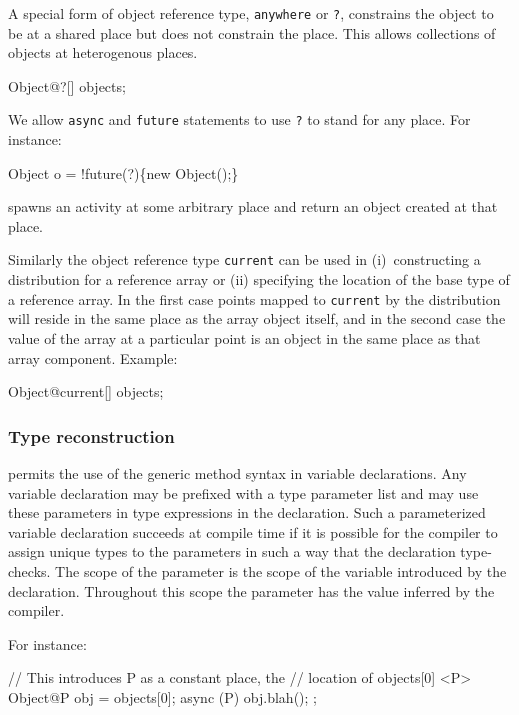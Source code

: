 A special form of object reference type, {\tt anywhere} or {\tt ?}, 
constrains the object to be at a shared place but does not constrain
the place. This allows collections of objects at heterogenous places.

\begin{x10}
    Object@?[] objects;
\end{x10}

We allow {\tt async} and {\tt future} statements to use {\tt ?} to
stand for any place. For instance:

\begin{x10}
     Object o = !future(?)\{new Object();\}
\end{x10}

\noindent spawns an activity at some arbitrary place and return an object created at that place.

Similarly the object reference type {\tt current} can be used in
(i)~constructing a distribution for a reference array or (ii)
specifying the location of the base type of a reference array. In the
first case points mapped to {\tt current} by the distribution will
reside in the same place as the array object itself, and in the second
case the value of the array at a particular point is an object in the
same place as that array component. Example:
\begin{x10}
    Object@current[] objects;
\end{x10}

\subsubsection{Type reconstruction}

{}\Xten{} permits the use of the generic method syntax in variable
declarations. Any variable declaration may be prefixed with a type
parameter list and may use these parameters in type expressions in the
declaration. Such a parameterized variable declaration succeeds at
compile time if it is possible for the compiler to assign unique types
to the parameters in such a way that the declaration type-checks.  The
scope of the parameter is the scope of the variable introduced by the
declaration. Throughout this scope the parameter has the value
inferred by the compiler.

For instance:
\begin{x10}
  // This introduces P as a constant place, the
  // location of objects[0]
 <P> Object@P obj = objects[0];
 async (P) { obj.blah(); };
\end{x10}

